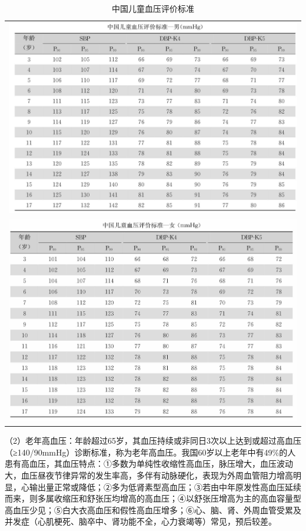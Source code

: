 \begin{longtable}{c}
    \caption{中国儿童血压评价标准}
    \label{tab12-3}
    \endfirsthead
    \caption[]{中国儿童血压评价标准}
    \endhead
    \includegraphics[width=\textwidth,height=\textheight,keepaspectratio]{./images/Image00084.jpg}\\
    \includegraphics[width=\textwidth,height=\textheight,keepaspectratio]{./images/Image00085.jpg}
\end{longtable}

（2）老年高血压：年龄超过65岁，其血压持续或非同日3次以上达到或超过高血压（≥140/90mmHg）诊断标准，称为老年高血压。我国60岁以上老年中有49\%的人患有高血压，其血压特点：①多数为单纯性收缩性高血压，脉压增大，血压波动大，血压昼夜节律异常的发生率高，多伴有动脉硬化，表现为外周血管阻力增高明显，心输出量正常或降低；②多为低肾素型高血压；③若由中年原发性高血压延续而来，则多属收缩压和舒张压均增高的高血压；④以舒张压增高为主的高血容量型高血压少见；⑤白大衣高血压和假性高血压增多；⑥心、脑、肾、外周血管受累及并发症（心肌梗死、脑卒中、肾功能不全，心力衰竭等）常见，预后较差。

